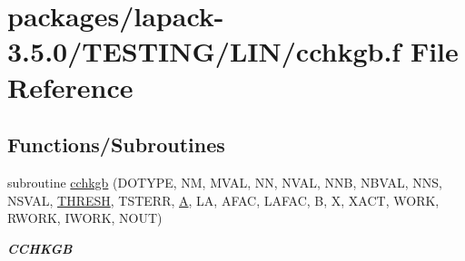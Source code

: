 \hypertarget{cchkgb_8f}{}\section{packages/lapack-\/3.5.0/\+T\+E\+S\+T\+I\+N\+G/\+L\+I\+N/cchkgb.f File Reference}
\label{cchkgb_8f}
\subsection*{Functions/\+Subroutines}
\begin{DoxyCompactItemize}
\item 
subroutine \hyperlink{group__complex__lin_ga9d53542bdb952017d1005904b47a995c}{cchkgb} (D\+O\+T\+Y\+P\+E, N\+M, M\+V\+A\+L, N\+N, N\+V\+A\+L, N\+N\+B, N\+B\+V\+A\+L, N\+N\+S, N\+S\+V\+A\+L, \hyperlink{zlaqgs_8c_a0656018abfc9fa2821827415f5d5ea57}{T\+H\+R\+E\+S\+H}, T\+S\+T\+E\+R\+R, \hyperlink{classA}{A}, L\+A, A\+F\+A\+C, L\+A\+F\+A\+C, B, X, X\+A\+C\+T, W\+O\+R\+K, R\+W\+O\+R\+K, I\+W\+O\+R\+K, N\+O\+U\+T)
\begin{DoxyCompactList}\small\item\em {\bfseries C\+C\+H\+K\+G\+B} \end{DoxyCompactList}\end{DoxyCompactItemize}
